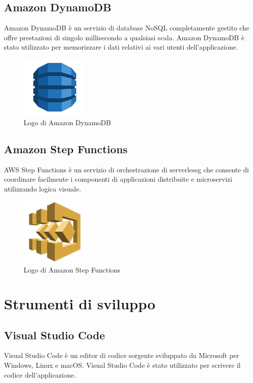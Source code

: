 \subsection{Amazon DynamoDB}
Amazon DynamoDB è un servizio di database NoSQL completamente gestito che offre prestazioni di singolo millisecondo a qualsiasi scala. Amazon DynamoDB è stato utilizzato per memorizzare i dati relativi ai vari utenti dell'applicazione.

\begin{figure}[h]
  \centering
  \includegraphics[width=0.3\textwidth]{img/tecnologie/DynamoDB.png}
  \caption{Logo di Amazon DynamoDB}
  \label{fig:dynamodb}
\end{figure}

\subsection{Amazon Step Functions}
AWS Step Functions è un servizio di orchestrazione di \gls{serverlessg} che consente di coordinare facilmente i componenti di applicazioni distribuite e microservizi utilizzando logica visuale. 

\begin{figure}[h]
  \centering
  \includegraphics[width=0.3\textwidth]{img/tecnologie/stepfunctions.png}
  \caption{Logo di Amazon Step Functions}
  \label{fig:stepfunctions}
\end{figure}

\section{Strumenti di sviluppo}
\subsection{Visual Studio Code}
Visual Studio Code è un editor di codice sorgente sviluppato da Microsoft per Windows, Linux e macOS. Visual Studio Code è stato utilizzato per scrivere il codice dell'applicazione.

